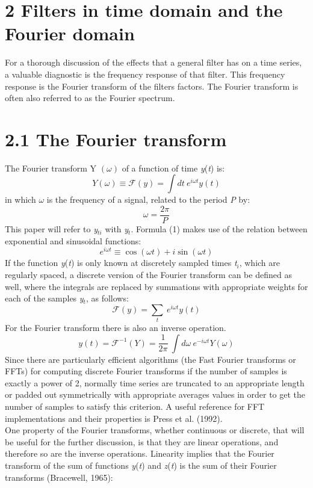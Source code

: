 \documentclass{article}
\begin{document}
\section*{2 Filters in time domain and the Fourier domain}
For a thorough discussion of the effects that a general filter has on a time series, a valuable diagnostic is the frequency response of that filter. This frequency response is the Fourier transform of the filters factors. The Fourier transform is often also referred to as the Fourier spectrum.
\section*{\small 2.1 The Fourier transform}
The Fourier transform Y $(\omega)$ of a function of time \textit{y}(\textit{t}) is:
\begin{equation}
Y (\omega)\equiv \mathcal{F} (\textit{y})= \int dt \ e^{i \omega t} y(\textit{t})
\end{equation}
in which $\omega$ is the frequency of a signal, related to the period \textit{P} by:
\begin{equation}
\omega = \frac {2\pi}{P}
\end{equation}
This paper will refer to \textit{y$_{ti}$} with \textit{y$_t$}. Formula (1) makes use of the relation between exponential and sinusoidal functions:
\begin{equation}
e^{i \omega t} \equiv \cos(\omega t) + i \sin(\omega t)
\end{equation}
If the function \textit{y}(\textit{t}) is only known at discretely sampled times \textit{t$_i$}, which are regularly spaced, a discrete version of the Fourier transform can be defined as well, where the integrals are replaced by summations with appropriate weights for each of the samples \textit{y$_t$}, as follows:
\begin{equation}
\mathcal{F}(y) = \sum_t  \ e^{i \omega t} y(\textit{t})
\end{equation}
For the Fourier transform there is also an inverse operation.
\begin{equation}
y(\textit{t}) = \mathcal{F}^{-1} (Y) = \frac {1}{2 \pi} \ \int d\omega \ e^{-i \omega t} Y(\omega)
\end{equation}
Since there are particularly efficient algorithms (the Fast Fourier transforms or FFTs) for computing discrete Fourier transforms if the number of samples is exactly a power of 2, normally time series are truncated to an appropriate length or padded out symmetrically with appropriate averages values in order to get the number of samples to satisfy this criterion. A useful reference for FFT implementations and their properties is Press et al. (1992).\\One property of the Fourier transforms, whether continuous or discrete, that will be useful for the further discussion, is that they are linear operations, and therefore so are the inverse operations. Linearity implies that the Fourier transform of the sum of functions \textit{y}(\textit{t}) and \textit{z}(\textit{t}) is the sum of their Fourier transforms (Bracewell, 1965):
\end{document}
